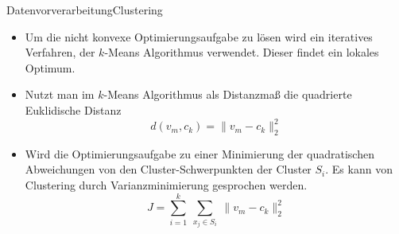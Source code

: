 \documentclass[169, handout	]{THIbeamer} %
\begin{document}
 	\begin{frame}{Datenvorverarbeitung}{Clustering}
 		\begin{itemize}
 			\item Um die nicht konvexe Optimierungsaufgabe zu lösen wird ein iteratives Verfahren, der $k$-Means Algorithmus verwendet. Dieser findet ein lokales Optimum.
 			\item Nutzt man im $k$-Means Algorithmus als Distanzmaß die quadrierte Euklidische Distanz
 			\begin{equation}
 			 	d(v_m, c_k) = \lVert v_m - c_k \rVert_2 ^2
 			\end{equation}
 			\item Wird die Optimierungsaufgabe zu einer Minimierung der quadratischen Abweichungen von den Cluster-Schwerpunkten der Cluster $S_i$. Es kann von Clustering durch Varianzminimierung gesprochen werden. 
 			\begin{equation}
				J = \sum_{i=1}^k\ \sum_{x_j \in S_i}^{}\ \lVert v_m - c_k \rVert_2^2
			\end{equation}
 		\end{itemize}
 	\end{frame}
%
\end{document}

